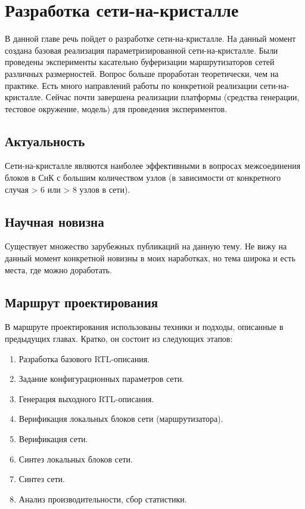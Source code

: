 
\chapter{Разработка сети-на-кристалле}

В данной главе речь пойдет о разработке сети-на-кристалле. На данный момент создана базовая реализация параметризированной сети-на-кристалле. Были проведены эксперименты касательно буферизации маршрутизаторов сетей различных размерностей. Вопрос больше проработан теоретически, чем на практике. Есть много направлений работы по конкретной реализации сети-на-кристалле. Сейчас почти завершена реализации платформы (средства генерации, тестовое окружение, модель) для проведения экспериментов.

\section{Актуальность}

Сети-на-кристалле являются наиболее эффективными в вопросах межсоединения блоков в СнК с большим количеством узлов (в зависимости от конкретного случая > 6 или > 8 узлов в сети).

\section{Научная новизна}

Существует множество зарубежных публикаций на данную тему. Не вижу на данный момент конкретной новизны в моих наработках, но тема широка и есть места, где можно доработать.

\section{Маршрут проектирования}

В маршруте проектирования использованы техники и подходы, описанные в предыдущих главах. Кратко, он состоит из следующих этапов:

\begin{enumerate}
  \item Разработка базового RTL-описания.
  \item Задание конфигурационных параметров сети.
  \item Генерация выходного RTL-описания.
  \item Верификация локальных блоков сети (маршрутизатора).
  \item Верификация сети.
  \item Синтез локальных блоков сети.
  \item Синтез сети.
  \item Анализ производительности, сбор статистики.
\end{enumerate}

